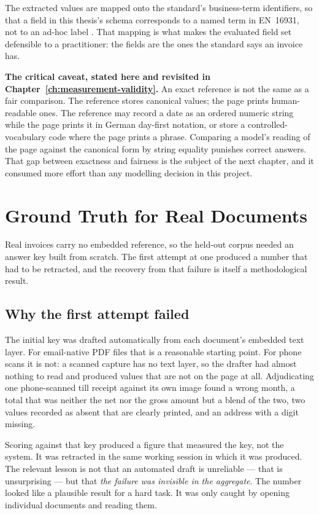 The extracted values are mapped onto the standard's business-term identifiers, so that a field
in this thesis's schema corresponds to a named term in \ac{EN}~16931, not to an
ad-hoc label \parencite{zugferdanhang}. That mapping is what makes the evaluated field set
defensible to a practitioner: the fields are the ones the standard says an invoice has.

\textbf{The critical caveat, stated here and revisited in
Chapter~\ref{ch:measurement-validity}.} An exact reference is not the same as a fair
comparison. The reference stores canonical values; the page prints human-readable ones. The
reference may record a date as an ordered numeric string while the page prints it in German
day-first notation, or store a controlled-vocabulary code where the page prints a phrase.
Comparing a model's reading of the page against the canonical form by string equality
punishes correct answers. That gap between exactness and fairness is the subject of the next
chapter, and it consumed more effort than any modelling decision in this project.

\section{Ground Truth for Real Documents}
\label{sec:method-heldout-gt}

Real invoices carry no embedded reference, so the held-out corpus needed an answer key built
from scratch. The first attempt at one produced a number that had to be retracted, and the
recovery from that failure is itself a methodological result.

\subsection{Why the first attempt failed}

The initial key was drafted automatically from each document's embedded text layer. For
email-native \ac{PDF} files that is a reasonable starting point. For phone scans it is not:
a scanned capture has no text layer, so the drafter had almost nothing to read and produced
values that are not on the page at all. Adjudicating one phone-scanned till receipt against
its own image found a wrong month, a total that was neither the net nor the gross amount but
a blend of the two, two values recorded as absent that are clearly printed, and an address
with a digit missing.

Scoring against that key produced a figure that measured the key, not the system. It
was retracted in the same working session in which it was produced. The relevant lesson is
not that an automated draft is unreliable --- that is unsurprising --- but that
\emph{the failure was invisible in the aggregate}. The number looked like a plausible
result for a hard task. It was only caught by opening individual documents and reading them.

